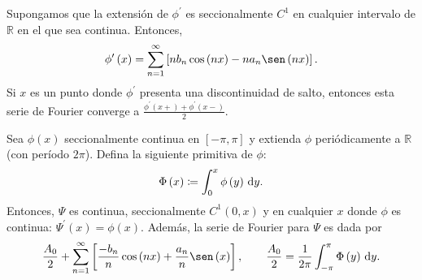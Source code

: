 \begin{theorem}
\begin{enumerate}[(a)]
              Supongamos que la extensión de $\phi^{\prime}$ es
              seccionalmente $C^{1}$ en cualquier intervalo de
              $\mathbb{R}$ en el que sea continua.
              Entonces,
              \begin{equation*}
                  \phi^{\prime}\left(x\right)=
                  \sum_{n=1}^{\infty}
                  \left[
                      nb_{n}
                      \cos\left(nx\right)-
                      na_{n}
                      \sen\left(nx\right)
                      \right].
              \end{equation*}
              Si $x$ es un punto donde $\phi^{\prime}$ presenta una
              discontinuidad de salto, entonces esta serie de Fourier
              converge a
              \begin{math}
                  \frac{
                      \phi^{\prime}\left(x+\right)+
                      \phi^{\prime}\left(x-\right)
                  }{2}
              \end{math}.
    \end{enumerate}
\end{theorem}

\begin{theorem}
    Sea $\phi\left(x\right)$ seccionalmente continua en
    $\left[-\pi,\pi\right]$ y extienda $\phi$ periódicamente a
    $\mathbb{R}$ (con período $2\pi$).
    Defina la siguiente primitiva de $\phi$:
    \begin{equation*}
        \Phi\left(x\right)\coloneqq
        \int_{0}^{x}
        \phi\left(y\right)\dl y.
    \end{equation*}
    Entonces, $\Psi$ es continua, seccionalmente
    $C^{1}\left(0,x\right)$ y en cualquier $x$ donde $\phi$ es
    continua: $\Psi^{\prime}\left(x\right)=\phi\left(x\right)$.
    Además, la serie de Fourier para $\Psi$ es dada por
    \begin{equation*}
        \frac{A_{0}}{2}+
        \sum_{n=1}^{\infty}
        \left[
        \frac{-b_{n}}{n}
        \cos\left(nx\right)+
        \frac{a_{n}}{n}
        \sen\left(x\right)
        \right],\qquad
        \frac{A_{0}}{2}=
        \frac{1}{2\pi}
        \int_{-\pi}^{\pi}
        \Phi\left(y\right)
        \dl y.
    \end{equation*}
\end{theorem}

